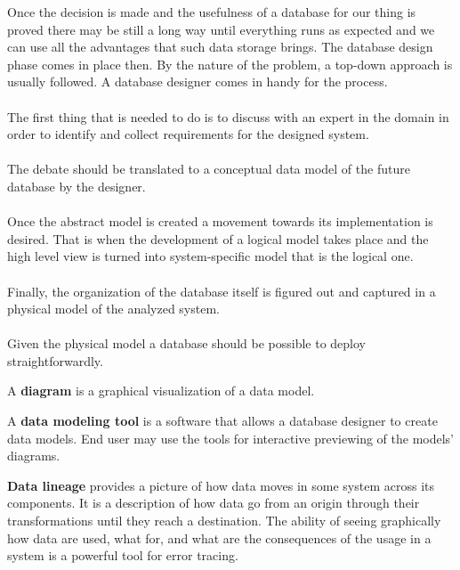 \par
Once the decision is made and the usefulness of a database for our thing is proved there may be still a long way until everything runs as expected and we can use all the advantages that such data storage brings.
The database design phase comes in place then. By the nature of the problem, a top-down approach is usually followed.
A database designer comes in handy for the process. \\ \\
The first thing that is needed to do is to discuss with an expert in the domain  in order to identify and collect requirements for the designed system. \\ \\
The debate should be translated to a conceptual data model of the future database by the designer.\\ \\
Once the abstract model is created a movement towards its implementation is desired. That is when the development of a logical model takes place and the high level view is turned into system-specific model that is the logical one. \\ \\
Finally, the organization of the database itself is figured out and captured in a physical model of the analyzed system. \\ \\
Given the physical model a database should be possible to deploy straightforwardly. \\

\par 
A \textbf{diagram} is a graphical visualization of a data model. \\
\par
A \textbf{data modeling tool} is a software that allows a database designer to create data models. End user may use the tools for interactive previewing of the models' diagrams. \\


\par
\textbf{Data lineage} provides a picture of how data moves in some system across its components. It is a description of how data go from an origin through their transformations until they reach a destination. 
The ability of seeing graphically how data are used, what for, and what are the consequences of the usage in a system is a powerful tool for error tracing. \\

